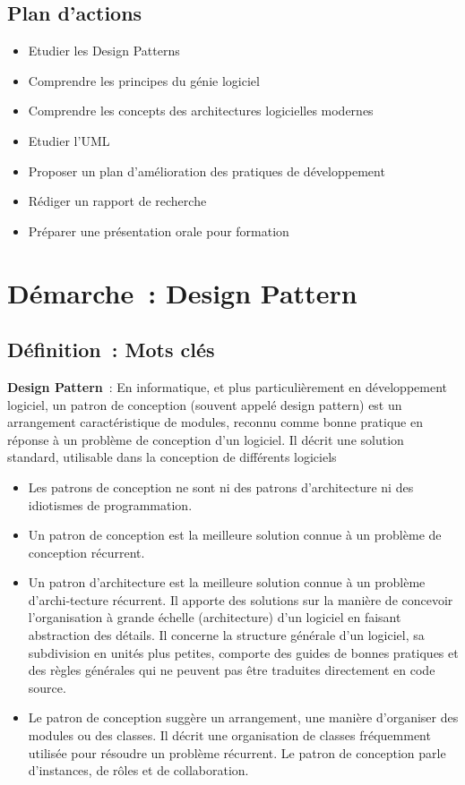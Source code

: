 \subsection*{Plan d'actions}
{}
\begin{itemize}
	\item Etudier les Design Patterns
	\item Comprendre les principes du génie logiciel
	\item Comprendre les concepts des architectures logicielles modernes
	\item Etudier l'UML
	\item Proposer un plan d'amélioration des pratiques de développement
	\item Rédiger un rapport de recherche
	\item Préparer une présentation orale pour formation
\end{itemize}

\newpage
\section*{Démarche~: Design Pattern}


\subsection*{Définition~: Mots clés}
{}

\noindent \textbf{Design Pattern}~: En informatique, et plus particulièrement en développement logiciel, un patron de conception (souvent appelé design pattern) est un arrangement caractéristique de modules, reconnu comme bonne pratique en réponse à un problème de conception d'un logiciel. Il décrit une solution standard, utilisable dans la conception de différents logiciels

\begin{itemize}
	\item Les patrons de conception ne sont ni des patrons d'architecture ni des idiotismes de programmation.
	\item Un patron de conception est la meilleure solution connue à un problème de conception récurrent.
	\item Un patron d'architecture est la meilleure solution connue à un problème d'archi-tecture récurrent. Il apporte des solutions sur la manière de concevoir l'organisation à grande échelle (architecture) d'un logiciel en faisant abstraction des détails. Il concerne la structure générale d'un logiciel, sa subdivision en unités plus petites, comporte des guides de bonnes pratiques et des règles générales qui ne peuvent pas être traduites directement en code source.
	\item Le patron de conception suggère un arrangement, une manière d'organiser des modules ou des classes. Il décrit une organisation de classes fréquemment utilisée pour résoudre un problème récurrent. Le patron de conception parle d'instances, de rôles et de collaboration.
\end{itemize}

